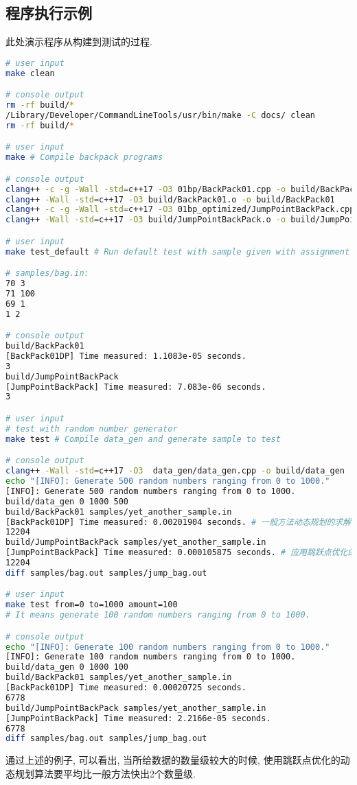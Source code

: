 \subsection{程序执行示例}
\label{sec:dpBench}
此处演示程序从构建到测试的过程.
\begin{lstlisting}[language=bash]
# user input
make clean

# console output
rm -rf build/*
/Library/Developer/CommandLineTools/usr/bin/make -C docs/ clean
rm -rf build/*

# user input
make # Compile backpack programs

# console output
clang++ -c -g -Wall -std=c++17 -O3 01bp/BackPack01.cpp -o build/BackPack01.o
clang++ -Wall -std=c++17 -O3 build/BackPack01.o -o build/BackPack01
clang++ -c -g -Wall -std=c++17 -O3 01bp_optimized/JumpPointBackPack.cpp -o build/JumpPointBackPack.o
clang++ -Wall -std=c++17 -O3 build/JumpPointBackPack.o -o build/JumpPointBackPack

# user input
make test_default # Run default test with sample given with assignment

# samples/bag.in:
70 3
71 100
69 1
1 2

# console output
build/BackPack01
[BackPack01DP] Time measured: 1.1083e-05 seconds.
3
build/JumpPointBackPack
[JumpPointBackPack] Time measured: 7.083e-06 seconds.
3

# user input
# test with random number generator
make test # Compile data_gen and generate sample to test

# console output
clang++ -Wall -std=c++17 -O3  data_gen/data_gen.cpp -o build/data_gen
echo "[INFO]: Generate 500 random numbers ranging from 0 to 1000."
[INFO]: Generate 500 random numbers ranging from 0 to 1000.
build/data_gen 0 1000 500
build/BackPack01 samples/yet_another_sample.in
[BackPack01DP] Time measured: 0.00201904 seconds. # 一般方法动态规划的求解时间
12204
build/JumpPointBackPack samples/yet_another_sample.in
[JumpPointBackPack] Time measured: 0.000105875 seconds. # 应用跳跃点优化的动态规划求解时间
12204
diff samples/bag.out samples/jump_bag.out

# user input
make test from=0 to=1000 amount=100
# It means generate 100 random numbers ranging from 0 to 1000.

# console output
echo "[INFO]: Generate 100 random numbers ranging from 0 to 1000."
[INFO]: Generate 100 random numbers ranging from 0 to 1000.
build/data_gen 0 1000 100
build/BackPack01 samples/yet_another_sample.in
[BackPack01DP] Time measured: 0.00020725 seconds.
6778
build/JumpPointBackPack samples/yet_another_sample.in
[JumpPointBackPack] Time measured: 2.2166e-05 seconds.
6778
diff samples/bag.out samples/jump_bag.out

\end{lstlisting}

通过上述的例子, 可以看出, 当所给数据的数量级较大的时候,
使用跳跃点优化的动态规划算法要平均比一般方法快出2个数量级.
